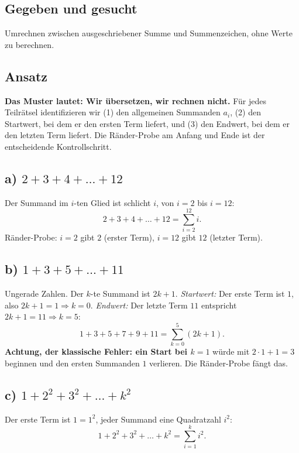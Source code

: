 

\subsection*{Gegeben und gesucht}
Umrechnen zwischen ausgeschriebener Summe und Summenzeichen, ohne Werte zu
berechnen.

\subsection*{Ansatz}
\textbf{Das Muster lautet: Wir übersetzen, wir rechnen nicht.} Für jedes
Teilrätsel identifizieren wir (1) den allgemeinen Summanden $a_i$,
(2) den Startwert, bei dem er den ersten Term liefert, und (3) den
Endwert, bei dem er den letzten Term liefert. Die Ränder-Probe am Anfang
und Ende ist der entscheidende Kontrollschritt.

\subsection*{a) $2+3+4+\dots+12$}
Der Summand im $i$-ten Glied ist schlicht $i$, von $i=2$ bis $i=12$:
\begin{equation}
  2+3+4+\dots+12 = \sum_{i=2}^{12} i .
\end{equation}
Ränder-Probe: $i=2$ gibt $2$ (erster Term), $i=12$ gibt $12$ (letzter
Term). \checkmark

\subsection*{b) $1+3+5+\dots+11$}
Ungerade Zahlen. Der $k$-te Summand ist $2k+1$. \emph{Startwert:} Der
erste Term ist $1$, also $2k+1=1\Rightarrow k=0$. \emph{Endwert:} Der
letzte Term $11$ entspricht $2k+1=11\Rightarrow k=5$:
\begin{equation}
  1+3+5+7+9+11=\sum_{k=0}^{5}(2k+1).
\end{equation}
\textbf{Achtung, der klassische Fehler: ein Start bei $k=1$} würde mit
$2\cdot1+1=3$ beginnen und den ersten Summanden $1$ verlieren. Die
Ränder-Probe fängt das.

\subsection*{c) $1+2^2+3^2+\dots+k^2$}
Der erste Term ist $1=1^2$, jeder Summand eine Quadratzahl $i^2$:
\begin{equation}
  1+2^2+3^2+\dots+k^2=\sum_{i=1}^{k} i^2 .
\end{equation}


